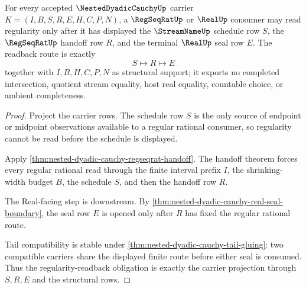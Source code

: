 \begin{theorem}
\label{thm:nested-dyadic-cauchy-obligation-regularity}
For every accepted $\NestedDyadicCauchyUp$ carrier $K=(I,B,S,R,E,H,C,P,N)$, a $\RegSeqRatUp$ or $\RealUp$ consumer may read regularity only after it has displayed the $\StreamNameUp$ schedule row $S$, the $\RegSeqRatUp$ handoff row $R$, and the terminal $\RealUp$ seal row $E$. The readback route is exactly
$$
S\longmapsto R\longmapsto E
$$
together with $I,B,H,C,P,N$ as structural support; it exports no completed intersection, quotient stream equality, host real equality, countable choice, or ambient completeness.
\end{theorem}
\begin{proof}
Project the carrier rows. The schedule row $S$ is the only source of endpoint or midpoint observations available to a regular rational consumer, so regularity cannot be read before the schedule is displayed.

Apply \autoref{thm:nested-dyadic-cauchy-regseqrat-handoff}. The handoff theorem forces every regular rational read through the finite interval prefix $I$, the shrinking-width budget $B$, the schedule $S$, and then the handoff row $R$.

The Real-facing step is downstream. By \autoref{thm:nested-dyadic-cauchy-real-seal-boundary}, the seal row $E$ is opened only after $R$ has fixed the regular rational route.

Tail compatibility is stable under \autoref{thm:nested-dyadic-cauchy-tail-gluing}: two compatible carriers share the displayed finite route before either seal is consumed. Thus the regularity-readback obligation is exactly the carrier projection through $S,R,E$ and the structural rows.
\end{proof}

